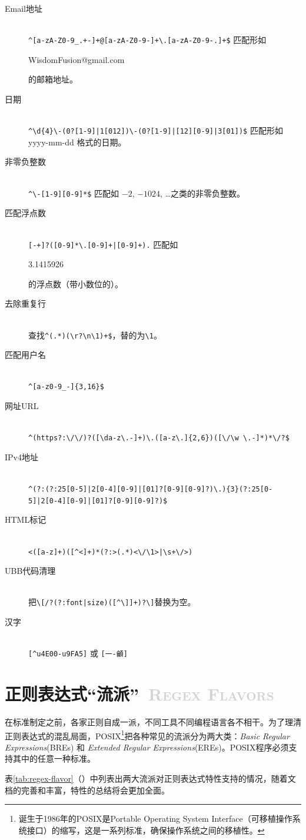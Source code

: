 \documentclass[12pt,a4paper,twoside]{ctexart}
\newcommand{\cbmatch}[1]{\colorbox{cyan!35}{\strut #1}}
\begin{document}
\begin{description}
\item[Email地址] \hfill \\
  \verb=^[a-zA-Z0-9_.+-]+@[a-zA-Z0-9-]+\.[a-zA-Z0-9-.]+$= 匹配形如 \cbmatch{WisdomFusion@gmail.com} 的邮箱地址。
\item[日期] \hfill \\
  \verb=^\d{4}\-(0?[1-9]|1[012])\-(0?[1-9]|[12][0-9]|3[01])$= 匹配形如 yyyy-mm-dd 格式的日期。
\item[非零负整数] \hfill \\
  \verb=^\-[1-9][0-9]*$= 匹配如 $-2$, $-1024$, \ldots 之类的非零负整数。
\item[匹配浮点数] \hfill \\
  \verb=[-+]?([0-9]*\.[0-9]+|[0-9]+).= 匹配如 \cbmatch{3.1415926} 的浮点数（带小数位的）{}。
\item[去除重复行] \hfill \\
  查找\verb=^(.*)(\r?\n\1)+$=，替的为\verb"\1"。
\item[匹配用户名] \hfill \\
  \verb=^[a-z0-9_-]{3,16}$=
\item[网址URL] \hfill \\
  \verb=^(https?:\/\/)?([\da-z\.-]+)\.([a-z\.]{2,6})([\/\w \.-]*)*\/?$=
\item[IPv4地址] \hfill \\
  \verb=^(?:(?:25[0-5]|2[0-4][0-9]|[01]?[0-9][0-9]?)\.){3}(?:25[0-5]|2[0-4][0-9]|[01]?[0-9][0-9]?)$=
\item[HTML标记] \hfill \\
  \verb=<([a-z]+)([^<]+)*(?:>(.*)<\/\1>|\s+\/>)=
\item[UBB代码清理] \hfill \\
  把\verb=\[/?(?:font|size)([^\]]+)?\]=替换为空。
\item[汉字] \hfill \\
  \verb=[^u4E00-u9FA5]= 或 \verb=[一-龥]=
\end{description}

\section[正则表达式“流派”]{正则表达式“流派”~\textcolor{lightgray}{\textsc{Regex Flavors}}}
\label{sec:flavor}

在标准制定之前，各家正则自成一派，不同工具不同编程语言各不相干。为了理清正则表达式的混乱局面，POSIX\footnote{诞生于1986年的POSIX是Portable Operating System Interface（可移植操作系统接口）的缩写，这是一系列标准，确保操作系统之间的移植性。}把各种常见的流派分为两大类：\textit{Basic Regular Expressions}(BREs) 和 \textit{Extended Regular Expressions}(EREs)。POSIX程序必须支持其中的任意一种标准。\par
表\ref{tab:regex-flavor}（）中列表出两大流派对正则表达式特性支持的情况，随着文档的完善和丰富，特性的总结将会更加全面。\par
\end{document}
